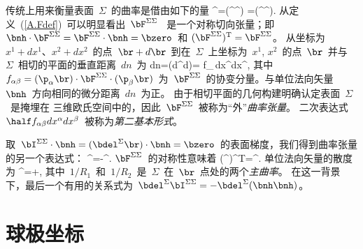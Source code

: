 传统上用来衡量表面~$\Sigma$~的曲率是借由如下的量
\eq \label{A.Fdef}
\bF^{\Sigma\Sigma}=(\bdel^{\Sigma}\bI^{\Sigma\Sigma})\cdot\bnh
=(\bdel^{\Sigma}\bdel^{\Sigma}\br)\cdot\bnh.
\en
从定义~(\ref{A.Fdef})~可以明显看出~$\bF^{\Sigma\Sigma}$~ 是一个对称切向张量；即~$\bnh\cdot\bF^{\Sigma\Sigma}=
\bF^{\Sigma\Sigma}\cdot\bnh=\bzero$~和
$(\bF^{\Sigma\Sigma})^{\rm T}=\bF^{\Sigma\Sigma}$。
从坐标为~$x^1+dx^1$、$x^2+dx^2$~的点~$\br+d\/\br$~到在~$\Sigma$~上坐标为~$x^1$, $x^2$~的点~$\br$~并与~$\Sigma$~相切的平面的垂直距离~$dn$~为
\eq \label{A.perpdist}
dn=\half (d\/\br\cdot\bF^{\Sigma\Sigma}\cdot d\/\br)=
\half f_{\alpha\beta}\,dx^{\alpha}dx^{\beta},
\en
其中~$f_{\alpha\beta}=(\p_{\alpha}\br)\cdot\bF^{\Sigma\Sigma}
\cdot(\p_{\beta}\br)$~为~$\bF^{\Sigma\Sigma}$~的协变分量。与单位法向矢量~ $\bnh$~方向相同的微分距离~$dn$~为正。
由于相切平面的几何构建明确认定表面~$\Sigma$~是掩埋在
三维欧氏空间中的，因此~$\bF^{\Sigma\Sigma}$~被称为“外”{\em 曲率张量\/}。
二次表达式~$\half f_{\alpha\beta}dx^{\alpha}dx^{\beta}$~被称为{\em 第二基本形式\/}。
%
%

取~$\bI^{\Sigma\Sigma}\cdot\bnh=(\bdel^{\Sigma}\br)\cdot\bnh=\bzero$~的表面梯度，我们得到曲率张量的另一个表达式：
\eq \label{A.Fdef2}
\bF^{\Sigma\Sigma}=-\bdel^{\Sigma}\bnh.
\en
$\bF^{\Sigma\Sigma}$~的对称性意味着
\eq \label{A.Fsymm}
(\bdel^{\Sigma}\bnh)^{\rm T}=\bdel^{\Sigma}\bnh.
\en
单位法向矢量的散度为
\eq \label{A.delSign}
\bdel^{\Sigma}\cdot\bnh=+,
\en
其中~$1/R_1$~和~$1/R_2$~是~$\Sigma$~在~$\br$~点处的两个{\em 主曲率\/}。
%
%
在这一背景下，最后一个有用的关系式为~$\bdel^{\Sigma}\bI^{\Sigma\Sigma}
=-\bdel^{\Sigma}(\bnh\bnh)$。
%
%

\section{球极坐标}
%
\label{A.sec.polcoord}

